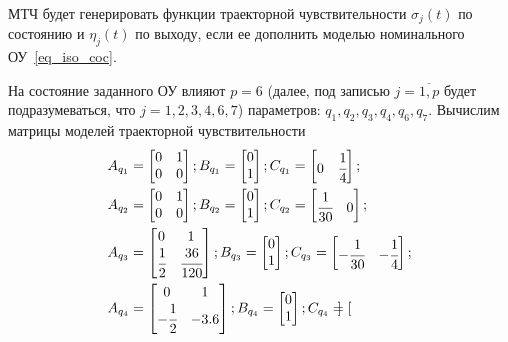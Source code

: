 МТЧ будет генерировать функции траекторной чувствительности $\sigma_j (t)$ по состоянию и $\eta_j (t)$ по выходу, если ее дополнить моделью номинального ОУ~\ref{eq_iso_coc}.

На состояние заданного ОУ влияют $p = 6$ (далее, под записью $j = \overline{1, p}$ будет подразумеваться, что $j = 1,2,3,4,6,7$) параметров: $q_1, q_2, q_3, q_4, q_6, q_7$. Вычислим матрицы моделей траекторной чувствительности
\begin{align}
	&A_{q_1} = 
	\begin{bmatrix}
		0 & 1\\
		0 & 0
	\end{bmatrix};
	B_{q_1} = 
	\begin{bmatrix}
		0\\
		1
	\end{bmatrix};
	C_{q_1} = 
	\begin{bmatrix}
		0 & \cfrac{1}{4}
	\end{bmatrix};\\
	&A_{q_2} = 
	\begin{bmatrix}
	0 & 1\\
	0 & 0
	\end{bmatrix};
	B_{q_2} = 
	\begin{bmatrix}
	0\\
	1
	\end{bmatrix};
	C_{q_2} = 
	\begin{bmatrix}
	\cfrac{1}{30} & 0
	\end{bmatrix};\\
	&A_{q_3} = 
	\begin{bmatrix}
	0 & 1\\
	\cfrac{1}{2} & \cfrac{36}{120}
	\end{bmatrix};
	B_{q_3} = 
	\begin{bmatrix}
	0\\
	1
	\end{bmatrix};
	C_{q_3} = 
	\begin{bmatrix}
	- \cfrac{1}{30} & - \cfrac{1}{4}
	\end{bmatrix};\\
	&A_{q_4} = 
	\begin{bmatrix}
	0 & 1\\
	- \cfrac{1}{2} & - 3.6
	\end{bmatrix};
	B_{q_4} = 
	\begin{bmatrix}
	0\\
	1
	\end{bmatrix};
	C_{q_4} = 
	\begin{bmatrix}

\end{bmatrix}
\end{align}
